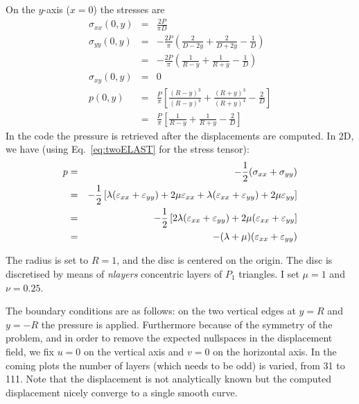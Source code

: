 On the $y$-axis ($x=0$) the stresses are 
\begin{eqnarray}
\sigma_{xx}(0,y) &=& \frac{2P}{\pi D} \\
\sigma_{yy}(0,y) 
&=& -\frac{2P}{\pi} \left( \frac{2}{D-2y} + \frac{2}{D+2y} -\frac{1}{D} \right) \\
&=& -\frac{2P}{\pi} \left( \frac{1}{R-y} + \frac{1}{R+y} -\frac{1}{D} \right) \\
\sigma_{xy} (0,y) &=& 0 \\
p(0,y) 
&=& \frac{P}{\pi} \left[ \frac{(R-y)^3 }{(R-y)^4} + \frac{ (R+y)^3  }{(R+y)^4}  - \frac{2}{D} \right] \\
&=& \frac{P}{\pi} \left[ \frac{1}{R-y} + \frac{ 1 }{R+y}  - \frac{2}{D} \right] 
\end{eqnarray}
In the code the pressure is retrieved after the displacements are computed. 
In 2D, we have (using Eq.~\ref{eq:twoELAST} for the stress tensor):
\begin{eqnarray}
p
&=& -\frac{1}{2}(\sigma_{xx} + \sigma_{yy}) \nonumber\\
&=& -\frac{1}{2} \left[
\lambda (\varepsilon_{xx}+\varepsilon_{yy}) + 2 \mu \varepsilon_{xx} +
\lambda (\varepsilon_{xx}+\varepsilon_{yy}) + 2 \mu \varepsilon_{yy} 
\right] \\
&=& -\frac{1}{2} \left[
2\lambda (\varepsilon_{xx}+\varepsilon_{yy}) + 2 \mu (\varepsilon_{xx} + \varepsilon_{yy} \right]\nonumber\\
&=& -(\lambda+\mu) (\varepsilon_{xx}+\varepsilon_{yy}) 
\end{eqnarray}

The radius is set to $R=1$, and the disc is centered on the origin. The disc 
is discretised by means of {\sl nlayers} concentric layers of $P_1$ triangles.
I set $\mu=1$ and $\nu=0.25$. 

The boundary conditions are as follows: on the two vertical edges at $y=R$ and $y=-R$ 
the pressure is applied. Furthermore because of the symmetry of the problem, 
and in order to remove the expected nullspaces in the displacement field, 
we fix $u=0$ on the vertical axis and $v=0$ on the horizontal axis.
In the coming plots the number of layers (which needs to be odd) is varied, from 31 to 111.
Note that the displacement is not analytically known but the computed displacement 
nicely converge to a single smooth curve.

